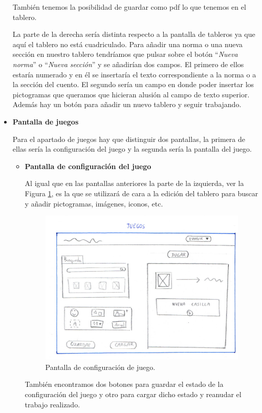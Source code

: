 \begin{itemize}
	También tenemos la posibilidad de guardar como pdf lo que tenemos en el tablero.
	
	
	La parte de la derecha sería distinta respecto a la pantalla de tableros ya que aquí el tablero no está cuadriculado. Para añadir una norma o una nueva sección en nuestro tablero tendríamos que pulsar sobre el botón “\textit{Nueva norma}” o “\textit{Nueva sección}” y se añadirían dos campos. El primero de ellos estaría numerado y en él se insertaría el texto correspondiente a la norma o a la sección del cuento. El segundo sería un campo en donde poder insertar los pictogramas que queramos que hicieran alusión al campo de texto superior. Además hay  un botón para añadir un nuevo tablero y seguir trabajando.
	
	
	\item \textbf{Pantalla de juegos}
	
	Para el apartado de juegos hay que distinguir dos pantallas, la primera de ellas sería la configuración del juego y la segunda sería la pantalla del juego.
	
	\begin{itemize}
		\item \textbf{Pantalla de configuración del juego}
		
		Al igual que en las pantallas anteriores la parte de la izquierda, ver la Figura \ref{fig:juegosjorge}, es la que se utilizará de cara a la edición del tablero para buscar  y añadir pictogramas, imágenes, iconos, etc.
		
		\begin{figure}[h!]
			\centering
			\includegraphics[width=0.7\linewidth]{Imagenes/Bitmap/juegosJorge}
			\caption{Pantalla de configuración de juego.}
			\label{fig:juegosjorge}
		\end{figure}
		
		También encontramos dos botones para guardar el estado de la configuración del juego y otro para cargar dicho estado y reanudar el trabajo realizado.
		

\end{itemize}
\end{itemize}
